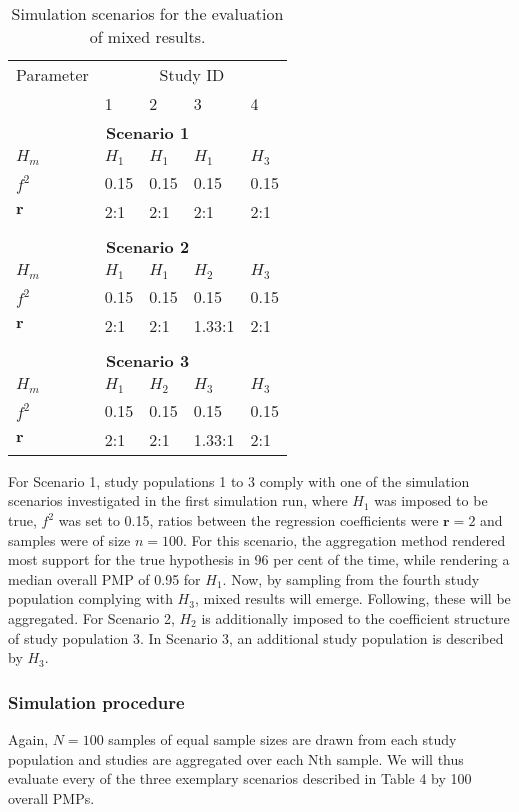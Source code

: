 \documentclass[11pt, a4paper]{article} %
\begin{document}
\begin{table}[ht]
	\centering
	\caption{Simulation scenarios for the evaluation of mixed results.}
	\label{my-label}
	\begin{tabular}{lllll}
		\hline
		Parameter & \multicolumn{4}{c}{Study ID}   \\
		& 1     & 2     & 3      & 4     \\ \hline
		\multicolumn{5}{c}{\textbf{Scenario 1}}    \\
		$H_m$     & $H_1$ & $H_1$ & $H_1$  & $H_3$ \\
		$f^2$     & 0.15  & 0.15  & 0.15   & 0.15  \\
		$\bm{r}$  & 2:1   & 2:1   & 2:1    & 2:1   \\
		&       &       &        &       \\
		\multicolumn{5}{c}{\textbf{Scenario 2}}    \\
		$H_m$     & $H_1$ & $H_1$ & $H_2$  & $H_3$ \\
		$f^2$     & 0.15  & 0.15  & 0.15   & 0.15  \\
		$\bm{r}$  & 2:1   & 2:1   & 1.33:1 & 2:1   \\
		&       &       &        &       \\
		\multicolumn{5}{c}{\textbf{Scenario 3}}    \\
		$H_m$     & $H_1$ & $H_2$ & $H_3$  & $H_3$ \\
		$f^2$     & 0.15  & 0.15  & 0.15   & 0.15  \\
		$\bm{r}$  & 2:1   & 2:1   & 1.33:1 & 2:1   \\ \hline
	\end{tabular}
\end{table}

\noindent For Scenario 1, study populations 1 to 3 comply with one of the simulation scenarios investigated in the first simulation run, where $H_1$ was imposed to be true, $f^2$ was set to 0.15, ratios between the regression coefficients were $\textbf{r}=2$ and samples were of size $n=100$. For this scenario, the aggregation method rendered most support for the true hypothesis in 96 per cent of the time, while rendering a median overall PMP of 0.95 for $H_1$. Now, by sampling from the fourth study population complying with $H_3$, mixed results will emerge. Following, these will be aggregated. For Scenario 2, $H_2$ is additionally imposed to the coefficient structure of study population 3. In Scenario 3, an additional study population is described by $H_3$. 

\subsubsection{Simulation procedure}
\noindent Again, $N=100$ samples of equal sample sizes are drawn from each study population and studies are aggregated over each Nth sample. We will thus evaluate every of the three exemplary scenarios described in Table 4 by 100 overall PMPs. 
\end{document}
